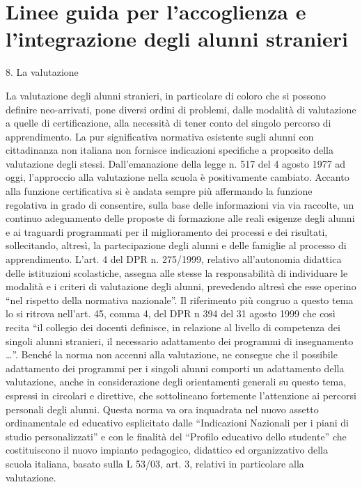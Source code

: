 \chapter[Accoglienza e integrazione alunni stranieri]{Linee guida
	per l'accoglienza e l'integrazione degli alunni stranieri}
\label{cha:AccoglienzaStudentiStranieri}
8. La valutazione

La valutazione degli alunni stranieri, in particolare di coloro che si possono definire
neo-arrivati, pone diversi ordini di problemi, dalle modalità di valutazione a quelle di
certificazione, alla necessità di tener conto del singolo percorso di apprendimento. La pur
significativa normativa esistente sugli alunni con cittadinanza non italiana non fornisce
indicazioni specifiche a proposito della valutazione degli stessi.
Dall'emanazione della legge n. 517 del 4 agosto 1977 ad oggi, l'approccio alla
valutazione nella scuola è positivamente cambiato. Accanto alla funzione certificativa si è
andata sempre più affermando la funzione regolativa in grado di consentire, sulla base delle
informazioni via via raccolte, un continuo adeguamento delle proposte di formazione alle
reali esigenze degli alunni e ai traguardi programmati per il miglioramento dei processi e dei
risultati, sollecitando, altresì, la partecipazione degli alunni e delle famiglie al processo di
apprendimento. L'art. 4 del DPR n. 275/1999, relativo all'autonomia didattica delle
istituzioni scolastiche, assegna alle stesse la responsabilità di individuare le modalità e i
criteri di valutazione degli alunni, prevedendo altresì che esse operino “nel rispetto della
normativa nazionale”.
Il riferimento più congruo a questo tema lo si ritrova nell'art. 45, comma 4, del DPR
n 394 del 31 agosto 1999 che così recita “il collegio dei docenti definisce, in relazione al
livello di competenza dei singoli alunni stranieri, il necessario adattamento dei programmi
di insegnamento …”. Benché la norma non accenni alla valutazione, ne consegue che il
possibile adattamento dei programmi per i singoli alunni comporti un adattamento della
valutazione, anche in considerazione degli orientamenti generali su questo tema, espressi in
circolari e direttive, che sottolineano fortemente l'attenzione ai percorsi personali degli
alunni. Questa norma va ora inquadrata nel nuovo assetto ordinamentale ed educativo
esplicitato dalle “Indicazioni Nazionali per i piani di studio personalizzati” e con le finalità
del “Profilo educativo dello studente” che costituiscono il nuovo impianto pedagogico, didattico ed organizzativo della scuola italiana, basato sulla L 53/03, art. 3, relativi in particolare alla valutazione.
